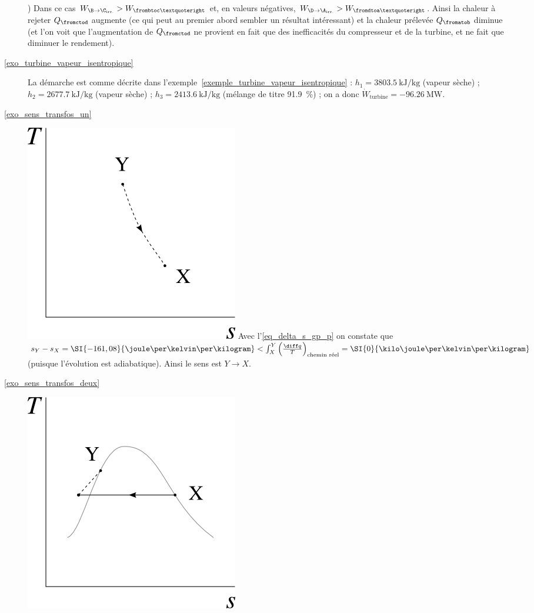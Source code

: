 \begin{description}
						) Dans ce cas $W_{\B\to\C_\text{irr.}} > W_{\frombtoc’}$ et, en valeurs négatives, $W_{\D\to\A_\text{irr.}} > W_{\fromdtoa’}$. Ainsi la chaleur à rejeter $Q_{\fromctod}$ augmente (ce qui peut au premier abord sembler un résultat intéressant) et la chaleur prélevée $Q_{\fromatob}$ diminue (et l’on voit que l’augmentation de $Q_{\fromctod}$ ne provient en fait que des inefficacités du compresseur et de la turbine, et ne fait que diminuer le rendement).
		\item [\ref{exo_turbine_vapeur_isentropique}]
						\tab La démarche est comme décrite dans l’exemple~\ref{exemple_turbine_vapeur_isentropique} : $h_1 = \SI{3803,5}{\kilo\joule\per\kilogram}$ (vapeur sèche) ; $h_2 = \SI{2677,7}{\kilo\joule\per\kilogram}$ (vapeur sèche) ; $h_3 = \SI{2413,6}{\kilo\joule\per\kilogram}$ (mélange de titre \SI{91,9}{\percent}) ; on a donc $\dot{W}_\text{turbine} = \SI{-96,26}{\mega\watt}$.
		\item [\ref{exo_sens_transfos_un}]
						\includegraphics[width=\solutiondiagramwidth]{images/exo_sol_ts_bonsens1.png}
						\tab\tab Avec l’\cref{eq_delta_s_gp_p} on constate que $s_Y - s_X = \SI{-161,08}{\joule\per\kelvin\per\kilogram} < \int_X^Y \left(\frac{\diff q}{T}\right)_\text{chemin réel} = \SI{0}{\kilo\joule\per\kelvin\per\kilogram}$ (puisque l’évolution est adiabatique). Ainsi le sens est $Y\to X$.
		\item [\ref{exo_sens_transfos_deux}]
						\includegraphics[width=\solutiondiagramwidth]{images/exo_sol_ts_bonsens2.png}

\end{description}
